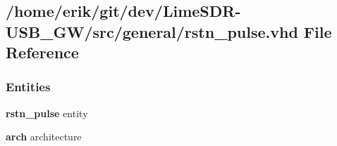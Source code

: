 \subsection{/home/erik/git/dev/\+Lime\+S\+D\+R-\/\+U\+S\+B\+\_\+\+G\+W/src/general/rstn\+\_\+pulse.vhd File Reference}
\label{rstn__pulse_8vhd}
\subsubsection*{Entities}
\begin{DoxyCompactItemize}
\item 
{\bf rstn\+\_\+pulse} entity
\item 
{\bf arch} architecture
\end{DoxyCompactItemize}
